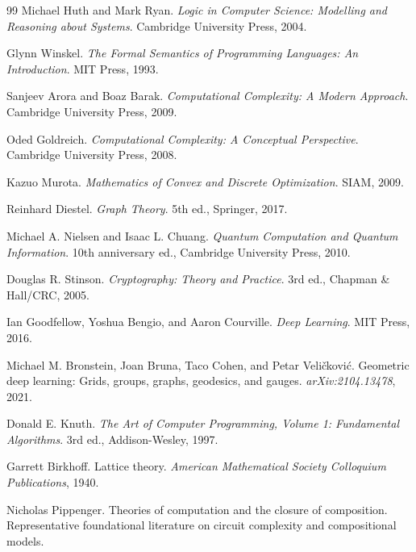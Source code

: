 \begin{thebibliography}{99}
Michael Huth and Mark Ryan.
\newblock \emph{Logic in Computer Science: Modelling and Reasoning about Systems}.
\newblock Cambridge University Press, 2004.

Glynn Winskel.
\newblock \emph{The Formal Semantics of Programming Languages: An Introduction}.
\newblock MIT Press, 1993.

Sanjeev Arora and Boaz Barak.
\newblock \emph{Computational Complexity: A Modern Approach}.
\newblock Cambridge University Press, 2009.

Oded Goldreich.
\newblock \emph{Computational Complexity: A Conceptual Perspective}.
\newblock Cambridge University Press, 2008.

Kazuo Murota.
\newblock \emph{Mathematics of Convex and Discrete Optimization}.
\newblock SIAM, 2009.

Reinhard Diestel.
\newblock \emph{Graph Theory}.
\newblock 5th ed., Springer, 2017.

Michael A. Nielsen and Isaac L. Chuang.
\newblock \emph{Quantum Computation and Quantum Information}.
\newblock 10th anniversary ed., Cambridge University Press, 2010.

Douglas R. Stinson.
\newblock \emph{Cryptography: Theory and Practice}.
\newblock 3rd ed., Chapman \& Hall/CRC, 2005.

Ian Goodfellow, Yoshua Bengio, and Aaron Courville.
\newblock \emph{Deep Learning}.
\newblock MIT Press, 2016.

Michael M. Bronstein, Joan Bruna, Taco Cohen, and Petar Veli\v{c}kovi\'c.
\newblock Geometric deep learning: Grids, groups, graphs, geodesics, and gauges.
\newblock \emph{arXiv:2104.13478}, 2021.

Donald E. Knuth.
\newblock \emph{The Art of Computer Programming, Volume 1: Fundamental Algorithms}.
\newblock 3rd ed., Addison-Wesley, 1997.

Garrett Birkhoff.
\newblock Lattice theory.
\newblock \emph{American Mathematical Society Colloquium Publications}, 1940.

Nicholas Pippenger.
\newblock Theories of computation and the closure of composition.
\newblock Representative foundational literature on circuit complexity and compositional models.

\end{thebibliography}

